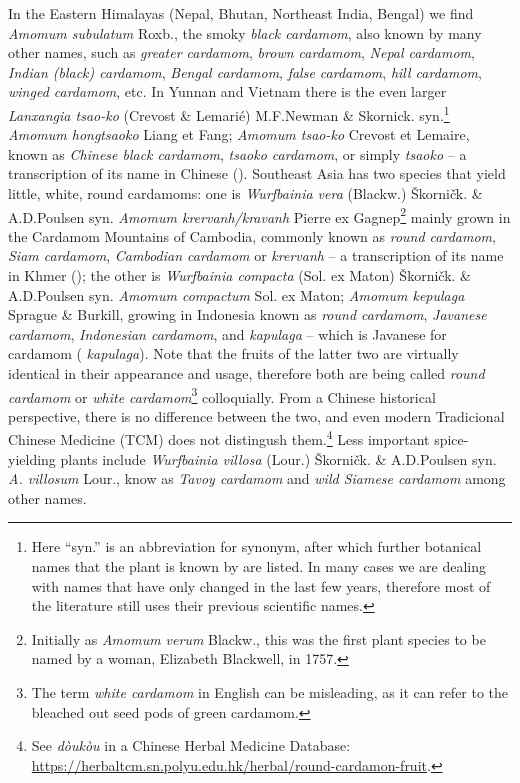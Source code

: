 \documentclass[12pt]{article}
\newcommand{\tc}[1]{\traditionalchinesefont{#1}\rmfamily}
\newcommand{\km}[1]{\khmerfont{#1}\rmfamily}
\newcommand{\jv}[1]{\javanesefont{#1}\rmfamily}
\begin{document}
In the Eastern Himalayas (Nepal, Bhutan, Northeast India, Bengal) we find \textit{Amomum subulatum} Roxb., the smoky \textit{black cardamom}, also known by many other names, such as \textit{greater cardamom}, \textit{brown cardamom}, \textit{Nepal cardamom}, \textit{Indian (black) cardamom}, \textit{Bengal cardamom}, \textit{false cardamom}, \textit{hill cardamom}, \textit{winged cardamom}, etc. In Yunnan and Vietnam there is the even larger \textit{Lanxangia tsao-ko} (Crevost \& Lemarié) M.F.Newman \& Skornick. syn.\footnote{Here ``syn.'' is an abbreviation for synonym, after which further botanical names that the plant is known by are listed. In many cases we are dealing with names that have only changed in the last few years, therefore most of the literature still uses their previous scientific names.} \textit{Amomum hongtsaoko} Liang et Fang; \textit{Amomum tsao-ko} Crevost et Lemaire, known as \textit{Chinese black cardamom}, \textit{tsaoko cardamom}, or simply \textit{tsaoko} -- a transcription of its name in Chinese (\tc{草果}). Southeast Asia has two species that yield little, white, round cardamoms: one is \textit{Wurfbainia vera} (Blackw.) Škorničk. \& A.D.Poulsen syn. \textit{Amomum krervanh/kravanh} Pierre ex Gagnep\footnote{Initially as \textit{Amomum verum} Blackw., this was the first plant species to be named by a woman, Elizabeth Blackwell, in 1757.} mainly grown in the Cardamom Mountains of Cambodia, commonly known as \textit{round cardamom}, \textit{Siam cardamom}, \textit{Cambodian cardamom} or \textit{krervanh} -- a transcription of its name in Khmer (\km{ក្រវាញ}); the other is \textit{Wurfbainia compacta} (Sol. ex Maton) Škorničk. \& A.D.Poulsen syn. \textit{Amomum compactum} Sol. ex Maton; \textit{Amomum kepulaga} Sprague \& Burkill, growing in Indonesia known as \textit{round cardamom}, \textit{Javanese cardamom}, \textit{Indonesian cardamom}, and \textit{kapulaga} -- which is Javanese for cardamom (\jv{ꦏꦥꦸꦭꦒ} \textit{kapulaga}). Note that the fruits of the latter two are virtually identical in their appearance and usage, therefore both are being called \textit{round cardamom} or \textit{white cardamom}\footnote{The term \textit{white cardamom} in English can be misleading, as it can refer to the bleached out seed pods of green cardamom.} colloquially. From a Chinese historical perspective, there is no difference between the two, and even modern Tradicional Chinese Medicine (TCM) does not distingush them.\footnote{See \textit{dòukòu} in a Chinese Herbal Medicine Database: \url{https://herbaltcm.sn.polyu.edu.hk/herbal/round-cardamon-fruit}.} Less important spice-yielding plants include \textit{Wurfbainia villosa} (Lour.) Škorničk. \& A.D.Poulsen syn. \textit{A. villosum} Lour., know as \textit{Tavoy cardamom} and \textit{wild Siamese cardamom} among other names. 
\end{document}
